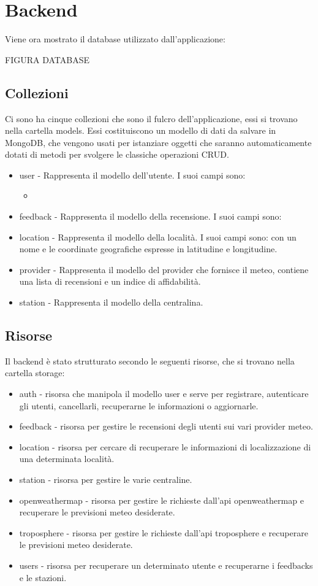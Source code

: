\section{Backend}
Viene ora mostrato il database utilizzato dall'applicazione:

FIGURA DATABASE
\subsection{Collezioni}
Ci sono ha cinque collezioni che sono il fulcro dell'applicazione, essi si trovano nella cartella models. Essi costituiscono un modello di dati da salvare in MongoDB, che vengono usati per istanziare oggetti che saranno automaticamente dotati di metodi per svolgere le classiche operazioni CRUD.
\begin{itemize}
\item user - Rappresenta il modello dell'utente. I suoi campi sono:
\begin{itemize}
\item
\end{itemize}
\item feedback - Rappresenta il modello della recensione. I suoi campi sono: 
\item location - Rappresenta il modello della località. I suoi campi sono:
con un nome e le coordinate geografiche espresse in latitudine e longitudine.
\item provider - Rappresenta il modello del provider che fornisce il meteo, contiene una lista di recensioni e un indice di affidabilità.
\item station - Rappresenta  il modello della centralina.
\end{itemize}
\subsection{Risorse}
Il backend è stato strutturato secondo le seguenti risorse, che si trovano nella cartella storage:
\begin{itemize}
\item auth - risorsa che manipola il modello user e serve per registrare, autenticare gli utenti, cancellarli, recuperarne le
informazioni o aggiornarle. 
\item feedback - risorsa per gestire le recensioni degli utenti sui vari provider meteo.
\item location - risorsa per cercare di recuperare le informazioni di localizzazione di una determinata località.
\item station - risorsa per gestire le varie centraline.
\item openweathermap - risorsa per gestire le richieste dall'api openweathermap e recuperare le previsioni meteo desiderate.
\item troposphere - risorsa per gestire le richieste dall'api troposphere e recuperare le previsioni meteo desiderate.
\item users - risorsa per recuperare un determinato utente e recuperarne i feedbacks e le stazioni.

\end{itemize}





